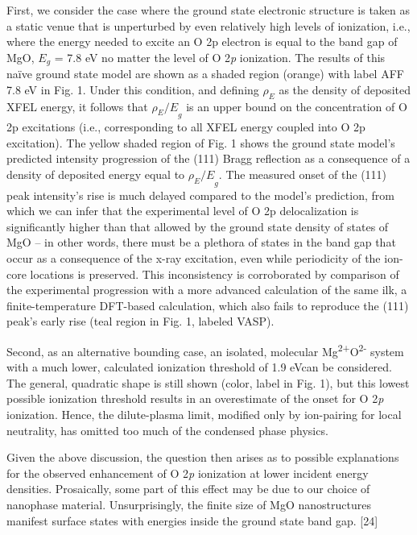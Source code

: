 First, we consider the case where the ground state electronic structure
is taken as a static venue that is unperturbed by even relatively high
levels of ionization, i.e., where the energy needed to excite an O 2p
electron is equal to the band gap of MgO, \(E_{g}\) = 7.8 eV no matter
the level of O 2\emph{p} ionization. The results of this naïve ground
state model are shown as a shaded region (orange) with label AFF 7.8 eV
in Fig. 1. Under this condition, and defining \(\rho_{E}\) as the
density of deposited XFEL energy, it follows that \({\rho_{E}/E}_{g}\)
is an upper bound on the concentration of O 2p excitations (i.e.,
corresponding to all XFEL energy coupled into O 2p excitation). The
yellow shaded region of Fig. 1 shows the ground state model's predicted
intensity progression of the (111) Bragg reflection as a consequence of
a density of deposited energy equal to \({\rho_{E}/E}_{g}.\) The
measured onset of the (111) peak intensity's rise is much delayed
compared to the model's prediction, from which we can infer that the
experimental level of O 2p delocalization is significantly higher than
that allowed by the ground state density of states of MgO -- in other
words, there must be a plethora of states in the band gap that occur as
a consequence of the x-ray excitation, even while periodicity of the
ion-core locations is preserved. This inconsistency is corroborated by
comparison of the experimental progression with a more advanced
calculation of the same ilk, a finite-temperature DFT-based calculation,
which also fails to reproduce the (111) peak's early rise (teal region
in Fig. 1, labeled VASP).

Second, as an alternative bounding case, an isolated, molecular
Mg\textsuperscript{2+}O\textsuperscript{2-} system with a much lower,
calculated ionization threshold of 1.9 eVcan be considered. The general,
quadratic shape is still shown (color, label in Fig. 1), but this lowest
possible ionization threshold results in an overestimate of the onset
for O 2\emph{p} ionization. Hence, the dilute-plasma limit, modified
only by ion-pairing for local neutrality, has omitted too much of the
condensed phase physics.

Given the above discussion, the question then arises as to possible
explanations for the observed enhancement of O 2\emph{p} ionization at
lower incident energy densities. Prosaically, some part of this effect
may be due to our choice of nanophase material. Unsurprisingly, the
finite size of MgO nanostructures manifest surface states with energies
inside the ground state band gap. {[}24{]}

